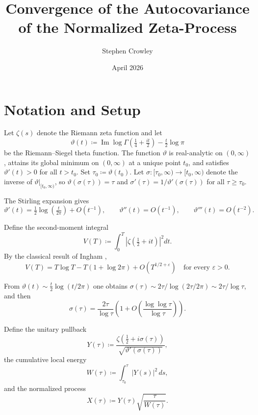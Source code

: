 \documentclass{amsart}
\title{Convergence of the Autocovariance of the Normalized Zeta-Process}
\author{Stephen Crowley}
\date{April 2026}
\newcommand{\assign}{\coloneqq}
\newcommand{\abs}[1]{\left|#1\right|}
\begin{document}
\maketitle

\section{Notation and Setup}

Let $\zeta(s)$ denote the Riemann zeta function and let
\[
\vartheta(t) \assign \operatorname{Im}\log\Gamma\!\left(\tfrac{1}{4}+\tfrac{it}{2}\right) - \tfrac{t}{2}\log\pi
\]
be the Riemann--Siegel theta function. The function $\vartheta$ is real-analytic
on $(0,\infty)$, attains its global minimum on $(0,\infty)$ at a unique point
$t_0$, and satisfies $\vartheta'(t) > 0$ for all $t > t_0$. Set $\tau_0 \assign
\vartheta(t_0)$. Let $\sigma : [\tau_0,\infty) \to [t_0,\infty)$ denote the
inverse of $\vartheta\big|_{[t_0,\infty)}$, so $\vartheta(\sigma(\tau))=\tau$
and $\sigma'(\tau) = 1/\vartheta'(\sigma(\tau))$ for all $\tau \ge \tau_0$.

The Stirling expansion gives
\begin{equation}\label{eq:theta-prime}
  \vartheta'(t) = \tfrac{1}{2}\log\!\left(\tfrac{t}{2\pi}\right) + O(t^{-1}),
  \qquad \vartheta''(t) = O(t^{-1}), \qquad \vartheta'''(t) = O(t^{-2}).
\end{equation}

Define the second-moment integral
\[
  V(T) \assign \int_0^T \abs{\zeta\!\left(\tfrac{1}{2}+it\right)}^2 dt.
\]
By the classical result of Ingham \cite{Ingham1928},
\begin{equation}\label{eq:Ingham}
  V(T) = T\log T - T(1 + \log 2\pi) + O(T^{1/2+\varepsilon})
  \quad\text{for every } \varepsilon > 0.
\end{equation}

From $\vartheta(t) \sim \tfrac{t}{2}\log(t/2\pi)$ one obtains
$\sigma(\tau) \sim 2\tau/\log(2\tau/2\pi) \sim 2\tau/\log\tau$, and then
\begin{equation}\label{eq:sigma-asymp}
  \sigma(\tau) = \frac{2\tau}{\log\tau}\left(1 + O\!\left(\frac{\log\log\tau}{\log\tau}\right)\right).
\end{equation}

Define the unitary pullback
\[
  Y(\tau) \assign \frac{\zeta\!\left(\tfrac{1}{2}+i\sigma(\tau)\right)}{\sqrt{\vartheta'(\sigma(\tau))}},
\]
the cumulative local energy
\[
  W(\tau) \assign \int_{\tau_0}^{\tau} \abs{Y(s)}^2\,ds,
\]
and the normalized process
\[
  X(\tau) \assign Y(\tau)\sqrt{\frac{\tau}{W(\tau)}}.
\]
\end{document}
